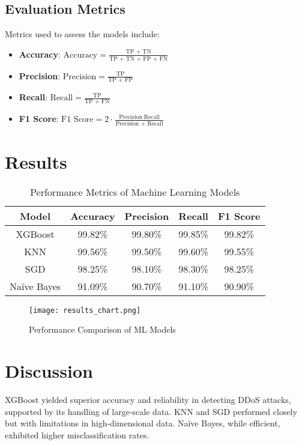 \documentclass[conference]{IEEEtran}
\begin{document}
\subsection{Evaluation Metrics}
Metrics used to assess the models include:
\begin{itemize}
    \item \textbf{Accuracy}: \( \text{Accuracy} = \frac{\text{TP + TN}}{\text{TP + TN + FP + FN}} \)
    \item \textbf{Precision}: \( \text{Precision} = \frac{\text{TP}}{\text{TP + FP}} \)
    \item \textbf{Recall}: \( \text{Recall} = \frac{\text{TP}}{\text{TP + FN}} \)
    \item \textbf{F1 Score}: \( \text{F1 Score} = 2 \cdot \frac{\text{Precision} \cdot \text{Recall}}{\text{Precision + Recall}} \)
\end{itemize}

\section{Results}

\begin{table}[htbp]
\caption{Performance Metrics of Machine Learning Models}
\begin{center}
\begin{tabular}{|c|c|c|c|c|}
\hline
Model & Accuracy & Precision & Recall & F1 Score \\
\hline
XGBoost & 99.82\% & 99.80\% & 99.85\% & 99.82\% \\
KNN & 99.56\% & 99.50\% & 99.60\% & 99.55\% \\
SGD & 98.25\% & 98.10\% & 98.30\% & 98.25\% \\
Naïve Bayes & 91.09\% & 90.70\% & 91.10\% & 90.90\% \\
\hline
\end{tabular}
\label{table:performance}
\end{center}
\end{table}

\begin{figure}[htbp]
\centerline{\texttt{[image: results\_chart.png]}}
\caption{Performance Comparison of ML Models}
\label{fig:results_chart}
\end{figure}

\section{Discussion}
XGBoost yielded superior accuracy and reliability in detecting DDoS attacks, supported by its handling of large-scale data. KNN and SGD performed closely but with limitations in high-dimensional data. Naïve Bayes, while efficient, exhibited higher misclassification rates.
\end{document}
